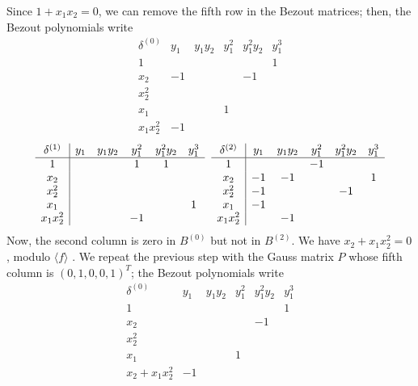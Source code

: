 \documentclass{standalone}
\begin{document}
Since $1 + x_1x_2 = 0$, we can remove the fifth row in the Bezout matrices; then, the Bezout polynomials write
$$
\begin{array}{c|ccccc}
	\delta^{(0)} & y_1 & y_1y_2 & y_1^2 & y_1^2y_2 & y_1^3 \\
	\hline
	1  &  &  &  &  & 1 \\
	x_2  & -1 &  &  & -1 & \\
	x_2^2  &  &  &  &  & \\
	x_1  &  &  & 1 &  & \\
	x_1x_2^2  & -1 &  &  &  &
\end{array}$$
$$
\begin{array}{c|ccccc}
	\delta^{(1)}  & y_1 & y_1y_2 & y_1^2 & y_1^2y_2 & y_1^3 \\
	\hline
	1  &  &  & 1 & 1 & \\
	x_2  &  &  &  &  & \\
	x_2^2  &  &  &  &  & \\
	x_1  &  &  &  &  & 1 \\
	x_1x_2^2  &  &  & -1 &  &
\end{array}
\hspace{0.2cm}
\begin{array}{c|ccccc}
	\delta^{(2)} & y_1 & y_1y_2 & y_1^2 & y_1^2y_2 & y_1^3 \\
	\hline
	1  &  &  & -1 &  & \\
	x_2  & -1 & -1 &  &  & 1 \\
	x_2^2  & -1 &  &  & -1 & \\
	x_1  & -1 &  &  &  & \\
	x_1x_2^2 &  & -1 &  &  &
\end{array}
$$
Now, the second column is zero in $B^{(0)}$ but not in $B^{(2)}$. We have $x_2 + x_1x_2^{2} = 0$, modulo $\langle f \rangle$ . We repeat the previous step with the Gauss matrix $P$ whose fifth column is $(0, 1, 0, 0, 1)^{T}$; the Bezout polynomials write
$$
\begin{array}{c|ccccc}
	\delta^{(0)} & y_1 & y_1y_2 & y_1^2 & y_1^2y_2 & y_1^3 \\
	\hline
	1  &  &  &  &  & 1 \\
	x_2  &  &  &  & -1 & \\
	x_2^2  &  &  &  &  & \\
	x_1  &  &  & 1 &  & \\
	x_2 + x_1x_2^2  & -1 &  &  &  &
\end{array}$$
\end{document}
